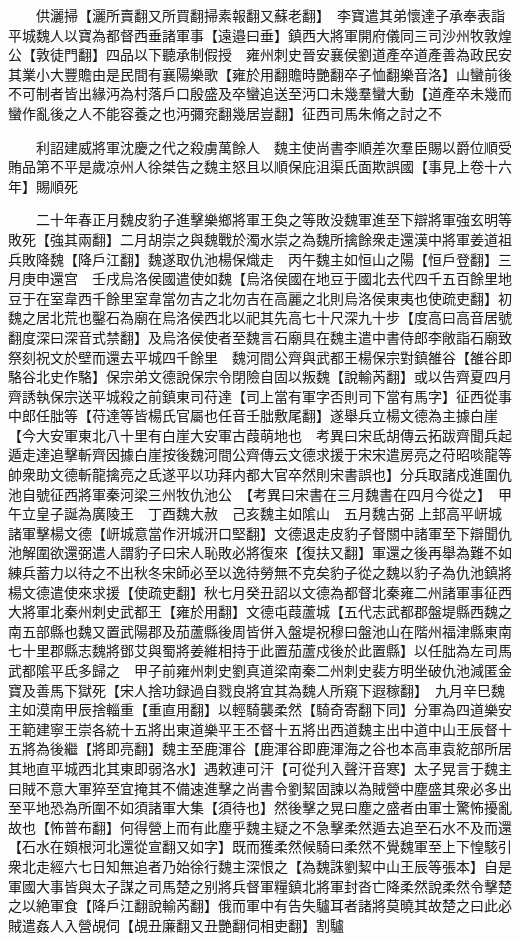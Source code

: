 　　供灑掃【灑所賣翻又所買翻掃素報翻又蘇老翻】　李寶遣其弟懷達子承奉表詣平城魏人以寶為都督西垂諸軍事【遠邉曰垂】鎮西大將軍開府儀同三司沙州牧敦煌公【敦徒門翻】四品以下聽承制假授　雍州刺史晉安襄侯劉道產卒道產善為政民安其業小大豐贍由是民間有襄陽樂歌【雍於用翻贍時艷翻卒子恤翻樂音洛】山蠻前後不可制者皆出緣沔為村落戶口殷盛及卒蠻追送至沔口未幾羣蠻大動【道產卒未幾而蠻作亂後之人不能容養之也沔彌兖翻幾居豈翻】征西司馬朱脩之討之不

　　利詔建威將軍沈慶之代之殺虜萬餘人　魏主使尚書李順差次羣臣賜以爵位順受賄品第不平是歲凉州人徐桀告之魏主怒且以順保庇沮渠氏面欺誤國【事見上卷十六年】賜順死

　　二十年春正月魏皮豹子進擊樂鄉將軍王奐之等敗没魏軍進至下辯將軍強玄明等敗死【強其兩翻】二月胡崇之與魏戰於濁水崇之為魏所擒餘衆走還漢中將軍姜道祖兵敗降魏【降戶江翻】魏遂取仇池楊保熾走　丙午魏主如恒山之陽【恒戶登翻】三月庚申還宫　壬戌烏洛侯國遣使如魏【烏洛侯國在地豆于國北去代四千五百餘里地豆于在室韋西千餘里室韋當勿吉之北勿吉在高麗之北則烏洛侯東夷也使疏吏翻】初魏之居北荒也鑿石為廟在烏洛侯西北以祀其先高七十尺深九十步【度高曰高音居號翻度深曰深音式禁翻】及烏洛侯使者至魏言石廟具在魏主遣中書侍郎李敞詣石廟致祭刻祝文於壁而還去平城四千餘里　魏河間公齊與武都王楊保宗對鎮雒谷【雒谷即駱谷北史作駱】保宗弟文德說保宗令閉險自固以叛魏【說輸芮翻】或以告齊夏四月齊誘執保宗送平城殺之前鎮東司苻達【司上當有軍字否則司下當有馬字】征西從事中郎任朏等【苻達等皆楊氏官屬也任音壬朏敷尾翻】遂舉兵立楊文德為主據白崖【今大安軍東北八十里有白崖大安軍古葭萌地也　考異曰宋氐胡傳云拓跋齊聞兵起遁走達追擊斬齊因據白崖按後魏河間公齊傳云文德求援于宋宋遣房亮之苻昭啖龍等帥衆助文德斬龍擒亮之氐遂平以功拜内都大官卒然則宋書誤也】分兵取諸戍進圍仇池自號征西將軍秦河梁三州牧仇池公　【考異曰宋書在三月魏書在四月今從之】　甲午立皇子誕為廣陵王　丁酉魏大赦　己亥魏主如隂山　五月魏古弼上邽高平岍城諸軍擊楊文德【岍城意當作汧城汧口堅翻】文德退走皮豹子督關中諸軍至下辯聞仇池解圍欲還弼遣人謂豹子曰宋人恥敗必將復來【復扶又翻】軍還之後再舉為難不如練兵蓄力以待之不出秋冬宋師必至以逸待勞無不克矣豹子從之魏以豹子為仇池鎮將楊文德遣使來求援【使疏吏翻】秋七月癸丑詔以文德為都督北秦雍二州諸軍事征西大將軍北秦州刺史武都王【雍於用翻】文德屯葭蘆城【五代志武都郡盤堤縣西魏之南五部縣也魏又置武陽郡及茄蘆縣後周皆併入盤堤祝穆曰盤池山在階州福津縣東南七十里郡縣志魏將鄧艾與蜀將姜維相持于此置茄蘆戍後於此置縣】以任朏為左司馬武都隂平氐多歸之　甲子前雍州刺史劉真道梁南秦二州刺史裴方明坐破仇池減匿金寶及善馬下獄死【宋人捨功録過自戮良將宜其為魏人所窺下遐稼翻】　九月辛巳魏主如漠南甲辰捨輜重【重直用翻】以輕騎襲柔然【騎奇寄翻下同】分軍為四道樂安王範建寧王崇各統十五將出東道樂平王丕督十五將出西道魏主出中道中山王辰督十五將為後繼【將即亮翻】魏主至鹿渾谷【鹿渾谷即鹿渾海之谷也本高車袁紇部所居其地直平城西北其東即弱洛水】遇敕連可汗【可從刋入聲汗音寒】太子晃言于魏主曰賊不意大軍猝至宜掩其不備速進擊之尚書令劉絜固諫以為賊營中塵盛其衆必多出至平地恐為所圍不如須諸軍大集【須待也】然後擊之晃曰塵之盛者由軍士驚怖擾亂故也【怖普布翻】何得營上而有此塵乎魏主疑之不急擊柔然遁去追至石水不及而還【石水在頞根河北還從宣翻又如字】既而獲柔然候騎曰柔然不覺魏軍至上下惶駭引衆北走經六七日知無追者乃始徐行魏主深恨之【為魏誅劉絜中山王辰等張本】自是軍國大事皆與太子謀之司馬楚之别將兵督軍糧鎮北將軍封沓亡降柔然說柔然令擊楚之以絶軍食【降戶江翻說輸芮翻】俄而軍中有告失驢耳者諸將莫曉其故楚之曰此必賊遣姦人入營覘伺【覘丑廉翻又丑艷翻伺相吏翻】割驢